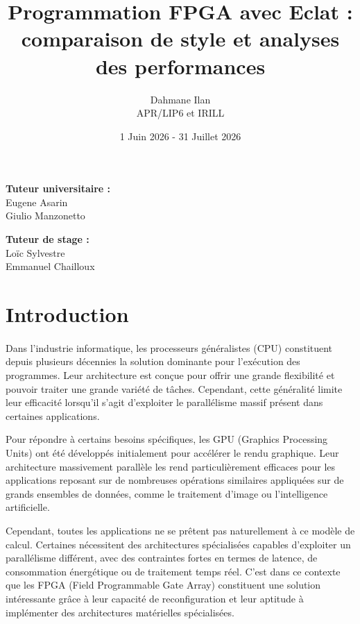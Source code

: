 \documentclass{article}
\title{Programmation FPGA avec Eclat : comparaison de style et analyses des performances}
\author {Dahmane Ilan \\ 
APR/LIP6 et IRILL   
}
\date{1 Juin 2026 - 31 Juillet 2026}
\begin{document}
\maketitle

\vfill

\begin{center}
\begin{minipage}{0.4\textwidth}
\textbf{Tuteur universitaire :}\\
Eugene Asarin\\
Giulio Manzonetto
\end{minipage}
\hfill
\begin{minipage}{0.4\textwidth}
\textbf{Tuteur de stage :}\\
Loïc Sylvestre\\
Emmanuel Chailloux
\end{minipage}
\end{center}

\newpage
\renewcommand{\contentsname}{Sommaire}
\tableofcontents


\newpage
\section{Introduction}
\paragraph{} Dans l'industrie informatique, les processeurs généralistes (CPU) constituent 
depuis plusieurs décennies la solution dominante pour l'exécution des programmes. 
Leur architecture est conçue pour offrir une grande flexibilité et pouvoir traiter une grande variété de tâches. 
Cependant, cette généralité limite leur efficacité lorsqu'il s'agit d'exploiter 
le parallélisme massif présent dans certaines applications.

Pour répondre à certains besoins spécifiques, les GPU (Graphics Processing Units) ont été développés 
initialement pour accélérer le rendu graphique. 
Leur architecture massivement parallèle les rend particulièrement efficaces pour 
les applications reposant sur de nombreuses opérations similaires appliquées sur 
de grands ensembles de données, comme le traitement d'image ou l'intelligence artificielle.

Cependant, toutes les applications ne se prêtent pas naturellement à ce modèle de calcul. 
Certaines nécessitent des architectures spécialisées capables d'exploiter un parallélisme différent, 
avec des contraintes fortes en termes de latence, de consommation énergétique ou de traitement temps réel. 
C'est dans ce contexte que les FPGA (Field Programmable Gate Array) constituent 
une solution intéressante grâce à leur capacité de reconfiguration \cite{sentieys:hal-00716772} et 
leur aptitude à implémenter des architectures matérielles spécialisées.
\end{document}
